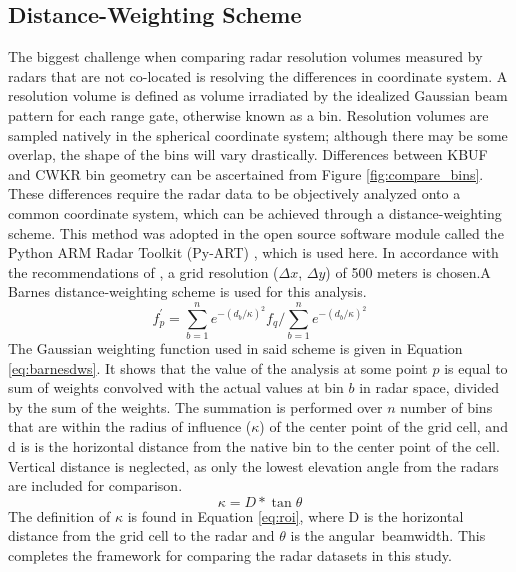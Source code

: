 \subsection{Distance-Weighting Scheme}
The biggest challenge when comparing radar resolution volumes measured by radars that are not co-located is resolving the differences in coordinate system. A
resolution volume is defined as volume irradiated by the idealized Gaussian beam pattern for each range gate, otherwise known as a bin. Resolution volumes
are sampled natively in the spherical coordinate system; although there may be some overlap, the shape of the bins will vary drastically. Differences between
KBUF and CWKR bin geometry can be ascertained from Figure \ref{fig:compare_bins}. 
These differences require the radar data to be objectively analyzed onto a common coordinate system, which can be achieved through a distance-weighting
scheme. This method was adopted in the open source software module called the Python ARM Radar Toolkit (Py-ART) \citep{Py-ART}, which is used here. In
accordance with the recommendations of \cite{Pauly1990}, a grid resolution ($\Delta x$, $\Delta y$) of 500 meters is chosen.A Barnes distance-weighting scheme is used for this analysis. 
\begin{equation}\label{eq:barnesdws}
f^{'}_{p} = \sum_{b=1}^n  e^{-(d_b/\kappa)^{2}} f_q  \bigg/ \sum_{b=1}^n e^{-(d_b/\kappa)^{2}}
\end{equation}
The Gaussian weighting function used in said scheme is given in Equation \ref{eq:barnesdws}. It shows that the value of the analysis at some point $p$ is
equal to sum of weights convolved with the actual values at bin $b$ in radar space, divided by the sum of the weights. The summation is performed over $n$
number of bins that are within the radius of influence ($\kappa$) of the center point of the grid cell, and d is is the horizontal distance from the native
bin to the center point of the cell. Vertical distance is neglected, as only the lowest elevation angle from the radars are included for comparison.
\begin{equation}\label{eq:roi}
\kappa = D * \tan{\theta}
\end{equation}
The definition of $\kappa$ is found in Equation \ref{eq:roi}, where D is the horizontal distance from the grid cell to the radar and $\theta$ is the angular\
beamwidth. This completes the framework for comparing the radar datasets in this study.
